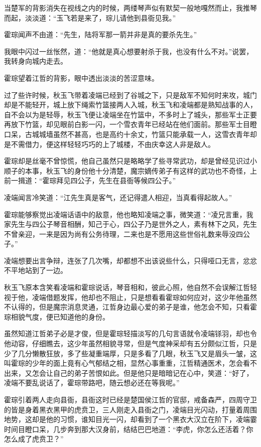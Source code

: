 当楚军的背影消失在视线之内的时候，两缕琴声似有默契一般地嘎然而止，我推琴而起，淡淡道：“玉飞若是来了，琮儿请他到县衙见我。”

霍琮闻声不由道：“先生，陆将军那一箭并非是真的要杀先生。”

我眼中闪过一丝怅然，道：“他就是真心想要射杀于我，也没有什么不对。”说罢，我转身向城内走去。

霍琮望着江哲的背影，眼中透出淡淡的苦涩意味。

过了些许时候，秋玉飞带着凌端已经到了谷城之下，只是敌军不知何时来攻，城门却是不能轻开，城上放下绳索竹篮接两人入城，秋玉飞和凌端都是熟知战事的人，自不会以为是轻辱，秋玉飞便让凌端坐在竹篮中，不多时上了城头，那些军士正要再放下竹篮，却见眼前白影一闪，一个雪衣青年已经站在他们面前。那些军士目瞪口呆，古城城墙虽然不甚高，也是高约十余丈，竹篮只能承载一人，这雪衣青年却是不需借力，便这样轻轻巧巧的上了城楼，不由庆幸这人非是敌人。

霍琮却是丝毫不曾惊慌，他自己虽然只是略略学了些寻常武功，却是曾经见识过小顺子的本事，秋玉飞的身份他十分清楚，魔宗嫡传弟子有这样的武功也不奇怪，上前一揖道：“霍琮拜见四公子，先生在县衙等候四公子。”

凌端闻言冷笑道：“江先生真是客气，还记得遣人相迎，当真看得起故人。”

霍琮能够察觉出凌端话语中的敌意，他也略知凌端之事，微笑道：“凌兄言重，我家先生与四公子琴音相酬，知己于心，四公子乃是世外之人，素有林下之风，先生不曾亲迎，一来是因为尚有公务待理，二来也是不愿用这些世俗礼数来辱没四公子。”

凌端想要出言争辩，连张了几次嘴，却都想不出该说些什么，只得哑口无言，忿忿不平地站到了一边。

秋玉飞原本含笑看凌端和霍琮说话，琴音相和，彼此心照，他自然不会误解江哲轻视于他，凌端借题发挥，他却也不阻止，只是想看看霍琮如何应对，这少年他虽然不认得的，但是魔宗消息灵通，江哲身边最心爱的弟子是谁，他怎会不知，只看霍琮相貌气度，便已知道他的身份。

虽然知道江哲弟子必是才俊，但是霍琮轻描淡写的几句言语就令凌端铩羽，却也令他动容，仔细瞧去，这少年虽然相貌寻常，但是气度神采却有五分颇似江哲，只是少了几分懒散狂放，多了些凝重端厚，只是多看了几眼，秋玉飞又是眉头一皱，这叫霍琮的少年的面上竟有心气郁结之相，显然心事重重，江哲精通医术，怎会看不出来，又怎会让自己的弟子苦恨如此。但是他只是暗暗记在心中，笑道：“好了，凌端不要乱说话了，霍琮带路吧，随云想必还在等我呢。”

霍琮引着两人走向县衙，县衙这时已经是楚国侯江哲的官邸，戒备森严，四周守卫的皆是身着黑衣黑甲的虎贲卫，三人刚走入县衙之门，凌端目光闪动，打量着周围地势，这却是他的习惯，谁知目光一闪，却看到了一个黑衣大汉立在阶下，凌端霎时间目瞪口呆，几步奔到那大汉身前，结结巴巴地道：“李虎，你怎么还活着？你怎么成了虎贲卫？”

